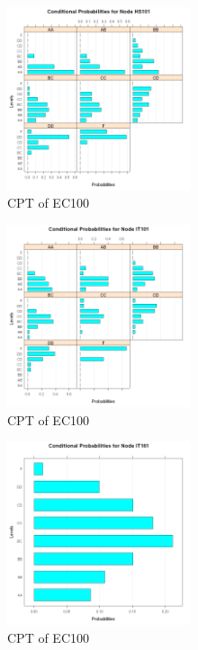 \documentclass[15pt,journal]{IEEEtran}
\begin{document}
\begin{figure}[H]%
\begin {center}
\includegraphics[width=0.48\textwidth]{images/hs101.png}
\caption{CPT of EC100} %
\label{fig:ecg}
\end {center}
\end{figure}

\begin{figure}[H]%
\begin {center}
\includegraphics[width=0.48\textwidth]{images/IT101.png}
\caption{CPT of EC100} %
\label{fig:ecg}
\end {center}
\end{figure}

\begin{figure}[H]%
\begin {center}
\includegraphics[width=0.48\textwidth]{images/IT161.png}
\caption{CPT of EC100} %
\label{fig:ecg}
\end {center}
\end{figure}
\end{document}
